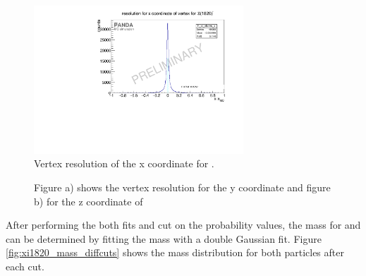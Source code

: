 	\begin{figure}
		\centering
		\includegraphics[width=0.7\textwidth]{./plots/Xi1820/XiMinus1820_vtxres_x.pdf}
		\caption{\propose Vertex resolution of the x coordinate for \excitedcascade.}
		\label{fig:Xi1820_vtxx}
	\end{figure}
	
	 \begin{figure}
		\centering
		\caption{\propose Figure a) shows the vertex resolution for the y coordinate and figure b) for the z coordinate of \excitedcascade}
		\label{fig:Xi1820_vtxyz}
	\end{figure}
	
	After performing the both fits and cut on the probability values, the mass for \excitedcascade and \excitedanticascade
	can be determined by fitting the mass with a double Gaussian fit. 
	Figure \ref{fig:xi1820_mass_diffcuts} shows the mass distribution for both particles after each cut.
	
